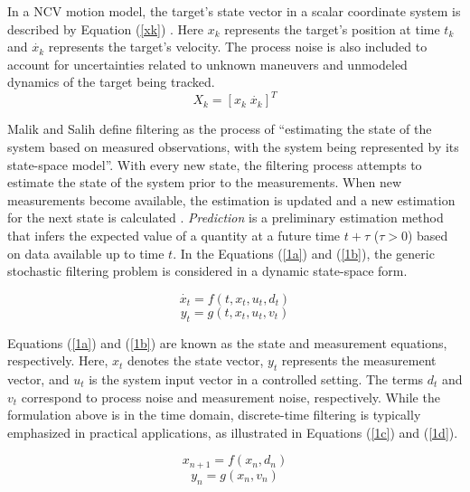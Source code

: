 In a \ac{NCV} motion model, the target's state vector in a scalar coordinate system is described by Equation (\ref{xk}) \cite{Richards2010}. Here $x_k$ represents the target's position at time $t_k$ and $\dot{x_k}$ represents the target's velocity. The process noise is also included to account for uncertainties related to unknown maneuvers and unmodeled dynamics of the target being tracked.
\begin{equation}
    X_k=[x_k\; \dot{x_k}]^T
    \label{xk}
\end{equation}

Malik and Salih\cite{Salih2011} define filtering as the process of ``estimating the state of the system based on measured observations, with the system being represented by its state-space model''. With every new state, the filtering process attempts to estimate the state of the system prior to the measurements. When new measurements become available, the estimation is updated and a new estimation for the next state is calculated \cite{CHEN2}. \textit{Prediction} is a preliminary estimation method that infers the expected value of a quantity at a future time \( t + \tau \) (\( \tau > 0 \)) based on data available up to time \( t \). In the Equations (\ref{1a}) and (\ref{1b}), the generic stochastic filtering problem is considered in a dynamic state-space form.

\begin{equation}
    \dot{x_t} = f(t,x_t,u_t,d_t)
    \label{1a}
\end{equation}
\begin{equation}
        y_t=g(t,x_t,u_t,v_t)
        \label{1b}
\end{equation}

Equations (\ref{1a}) and (\ref{1b}) are known as the state and measurement equations, respectively. Here, \( x_t \) denotes the state vector, \( y_t \) represents the measurement vector, and \( u_t \) is the system input vector in a controlled setting. The terms \( d_t \) and \( v_t \) correspond to process noise and measurement noise, respectively. While the formulation above is in the time domain, discrete-time filtering is typically emphasized in practical applications, as illustrated in Equations (\ref{1c}) and (\ref{1d}).

\begin{equation}
    x_{n+1} = f(x_n,d_n)
    \label{1c}
\end{equation}
\begin{equation}
    y_n=g(x_n,v_n)
    \label{1d}
\end{equation}

